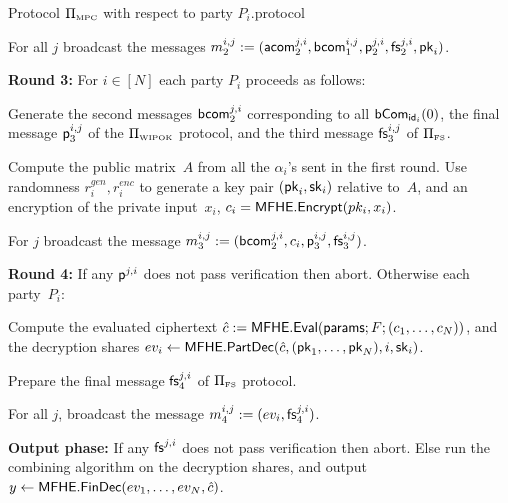 \begin{boxfig}{Protocol $\Pi_{\scriptscriptstyle\mathrm{MPC}}$ with respect to party $P_i$.\label{fig:MPC}}{protocol}

\item For all $j$ broadcast the messages $m^{i,j}_2:=(\mathsf{acom}^{j,i}_2, {\mathsf{bcom}}^{i,j}_1, \mathsf{p}^{j,i}_2, \mathsf{fs}^{j,i}_2,{\mathsf{pk}}_i)$.
\EE

{\bf Round 3:} For $i\in[N]$ each party $P_i$ proceeds as follows:
\BE
\item Generate the second messages ${\mathsf{bcom}}_2^{j,i}$ corresponding to all $\mathsf{bCom}_{\mathsf{id}_i}(0)$, the final message $\mathsf{p}_3^{i,j}$ of the $\Pi_{\scriptscriptstyle\mathrm{WIPOK}}$ protocol, and the third message $\mathsf{fs}^{i,j}_3$ of $\Pi_{\scriptscriptstyle\mathrm{FS}}$.

\item Compute the public matrix~$A$ from all the $\alpha_i$'s sent in the first round. Use randomness $r^{gen}_i,r^{enc}_i$ to generate a key pair $({\mathsf{pk}}_i,{\mathsf{sk}}_i)$ relative to~$A$, and an encryption of the private input~$x_i$, $c_i={\mathsf{MFHE.Encrypt}}(pk_i,x_i)$.

\item For $j$ broadcast the message $m^{i,j}_3:=({\mathsf{bcom}}^{j,i}_2,c_i, \mathsf{p}^{i,j}_3,\mathsf{fs}^{i,j}_3)$.

\EE
{\bf Round 4:} If any $\mathsf{p}^{j,i}$ does not pass verification then abort. Otherwise each party~$P_i$:
\BE
\item Compute the evaluated ciphertext ${{\hat{c}}}:= {\mathsf{MFHE.Eval}}({\mathsf{params}}; F; (c_1,\ldots, c_N))$, and the decryption shares $ev_i  \leftarrow {\mathsf{MFHE.PartDec}}({{\hat{c}}}, ({\mathsf{pk}}_1,\ldots, {\mathsf{pk}}_N), i, {\mathsf{sk}}_i)$.

\item Prepare the final message $\mathsf{fs}^{j,i}_4$ of $\Pi_{\scriptscriptstyle\mathrm{FS}}$ protocol.
\item For all $j$, broadcast the message $m^{i,j}_4:=(ev_i, \mathsf{fs}^{j,i}_4)$. 
\EE

{\bf Output phase:} If any $\mathsf{fs}^{j,i}$ does not pass verification then abort. Else run the combining algorithm on the decryption shares, and output $y \leftarrow {\mathsf{MFHE.FinDec}}(ev_1,\ldots, ev_N, {{\hat{c}}})$.
\label{MPC}
\end{boxfig}



